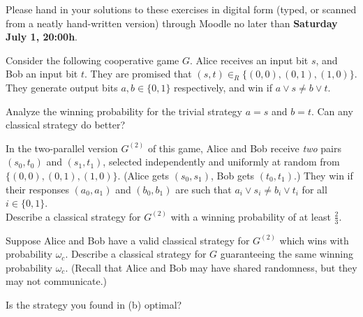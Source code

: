 \documentclass[a4paper,10pt,landscape,twocolumn]{scrartcl}
\newcommand\deadline{Saturday July 1, 20:00h}
\begin{document}
\newcommand{\Hmin}{\mathrm{H}_{\mathrm{min}}}

\homeworkproblems

{\sffamily\noindent
Please hand in your solutions to these exercises in digital form (typed, or scanned from a neatly hand-written version) through Moodle no later than \textbf{\deadline}.  %
}

\begin{exercise}
	Consider the following cooperative game $G$. Alice receives an input bit $s$, and Bob an input bit $t$. They are promised that $(s,t) \in_R \{(0,0),(0,1),(1,0)\}$. They generate output bits $a,b \in \{0,1\}$ respectively, and win if $a \vee s \neq b \vee t$.
	\begin{subex}
		Analyze the winning probability for the trivial strategy $a = s$ and $b = t$. Can any classical strategy do better?
	\end{subex}
    \begin{subex}
    	In the two-parallel version $G^{(2)}$ of this game, Alice and Bob receive \emph{two} pairs $(s_0, t_0)$ and $(s_1, t_1)$, selected independently and uniformly at random from $\{(0,0),(0,1),(1,0)\}$. (Alice gets $(s_0, s_1)$, Bob gets $(t_0, t_1)$.) They win if their responses $(a_0, a_1)$ and $(b_0, b_1)$ are such that $a_i \vee s_i \neq b_i \vee t_i$ for all $i \in \{0,1\}$.
    	\\
    	Describe a classical strategy for $G^{(2)}$ with a winning probability of at least $\frac{2}{3}$.
    \end{subex}
    \begin{subex}
    	Suppose Alice and Bob have a valid classical strategy for $G^{(2)}$ which wins with probability $\omega_c$. Describe a classical strategy for $G$ guaranteeing the same winning probability $\omega_c$. (Recall that Alice and Bob may have shared randomness, but they may not communicate.)
    \end{subex}
    \begin{subex}
    Is the strategy you found in (b) optimal?
    \end{subex}
\end{exercise}
\end{document}

